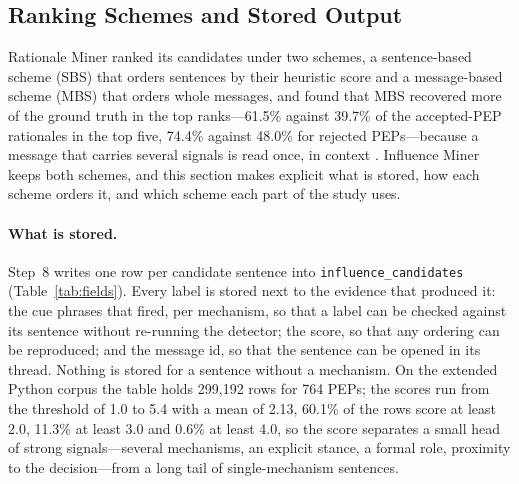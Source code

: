 \subsection{Ranking Schemes and Stored Output}
\label{sec:ranking}

Rationale Miner ranked its candidates under two schemes, a sentence-based scheme (SBS) that orders sentences by their heuristic score and a message-based scheme (MBS) that orders whole messages, and found that MBS recovered more of the ground truth in the top ranks---61.5\% against 39.7\% of the accepted-PEP rationales in the top five, 74.4\% against 48.0\% for rejected PEPs---because a message that carries several signals is read once, in context \cite{sharma2021rationale}. Influence Miner keeps both schemes, and this section makes explicit what is stored, how each scheme orders it, and which scheme each part of the study uses.

\paragraph{What is stored.} Step~8 writes one row per candidate sentence into \texttt{influence\_candidates} (Table~\ref{tab:fields}). Every label is stored next to the evidence that produced it: the cue phrases that fired, per mechanism, so that a label can be checked against its sentence without re-running the detector; the score, so that any ordering can be reproduced; and the message id, so that the sentence can be opened in its thread. Nothing is stored for a sentence without a mechanism. On the extended Python corpus the table holds 299,192 rows for 764 PEPs; the scores run from the threshold of 1.0 to 5.4 with a mean of 2.13, 60.1\% of the rows score at least 2.0, 11.3\% at least 3.0 and 0.6\% at least 4.0, so the score separates a small head of strong signals---several mechanisms, an explicit stance, a formal role, proximity to the decision---from a long tail of single-mechanism sentences.

